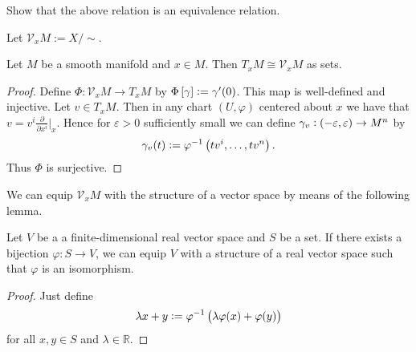 \begin{exercise}
	Show that the above relation is an equivalence relation.
\end{exercise}

Let $\mathcal{V}_xM := X/{\sim}$.

\begin{proposition}
	Let $M$ be a smooth manifold and $x \in M$. Then $T_xM \cong \mathcal{V}_xM$ as sets.
\end{proposition}

\begin{proof}
	Define $\Phi : \mathcal{V}_xM \to T_xM$ by $\Phi\sbr[0]{\gamma} := \gamma'(0)$. This map is well-defined and injective. Let $v \in T_xM$. Then in any chart $(U,\varphi)$ centered about $x$ we have that $v = v^i\frac{\partial}{\partial x^i}\big\vert_x$. Hence for $\varepsilon > 0$ sufficiently small we can define $\gamma_v : \intoo{-\varepsilon,\varepsilon} \to M^n$ by
	\begin{equation*}
		\gamma_v(t) := \varphi^{-1}\del[1]{tv^i,\dots,tv^n}.
	\end{equation*}
	Thus $\Phi$ is surjective.
\end{proof}

We can equip $\mathcal{V}_xM$ with the structure of a vector space by means of the following lemma.

\begin{lemma}
	Let $V$ be a a finite-dimensional real vector space and $S$ be a set. If there exists a bijection $\varphi : S \to V$, we can equip $V$ with a structure of a real vector space such that $\varphi$ is an isomorphism.
\end{lemma}

\begin{proof}
	Just define 
	\begin{equation*}
		\lambda x + y := \varphi^{-1}\del[1]{\lambda \varphi(x) + \varphi(y)}
	\end{equation*}
	\noindent for all $x,y \in S$ and $\lambda \in \mathbb{R}$.
\end{proof}
